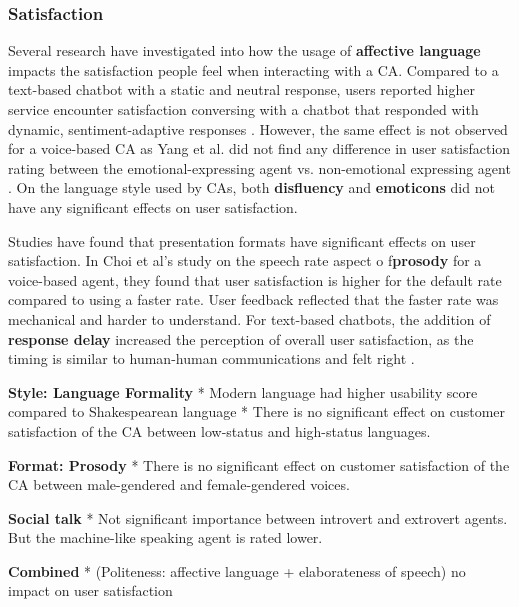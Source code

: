 \documentclass[sigconf,screen,review, anonymous]{acmart}
\newcommand{\cmt}[1]{}%
\begin{document}
\subsubsection{Satisfaction}
Several research have investigated into how the usage of \textbf{affective language} impacts the satisfaction people feel when interacting with a CA. Compared to a text-based chatbot with a static and neutral response, users reported higher service encounter satisfaction conversing with a chatbot that responded with dynamic, sentiment-adaptive responses \cite{diederich2019emulating}\cmt{[25]}. However, the same effect is not observed for a voice-based CA as Yang et al. did not find any difference in user satisfaction rating between the emotional-expressing agent vs. non-emotional expressing agent \cite{yang2017perceived}\cmt{[44]}. On the language style used by CAs, both \textbf{disfluency} \cite{pfeifer2009should}\cmt{[12]} and \textbf{emoticons} \cite{wilhelm2022keep}\cmt{[28]} did not have any significant effects on user satisfaction.

Studies have found that presentation formats have significant effects on user satisfaction. In Choi et al's study \cite{choi2020nobody}\cmt{[54]} on the speech rate aspect o f\textbf{prosody} for a voice-based agent, they found that user satisfaction is higher for the default rate compared to using a faster rate. User feedback reflected that the faster rate was mechanical and harder to understand. For text-based chatbots, the addition of \textbf{response delay} increased the perception of overall user satisfaction, as the timing is similar to human-human communications and felt right \cite{gnewuch2018faster}\cmt{[19]}. 

\textbf{Style: Language Formality}
* Modern language had higher usability score compared to Shakespearean language \cite{elsholz2019exploring}\cmt{[61]}
* There is no significant effect on customer satisfaction of the CA between low-status and high-status languages. \cite{habler2019effects}\cmt{[63]}

\textbf{Format: Prosody}
* There is no significant effect on customer satisfaction of the CA between male-gendered and female-gendered voices. \cite{habler2019effects}\cmt{[63]}

\textbf{Social talk}
* Not significant importance between introvert and extrovert agents. But the machine-like speaking agent is rated lower. \cite{roy2021users}\cmt{[71]}

\textbf{Combined}
* (Politeness: affective language + elaborateness of speech) no impact on user satisfaction \cite{hu2022polite}\cmt{[76]}
\end{document}
